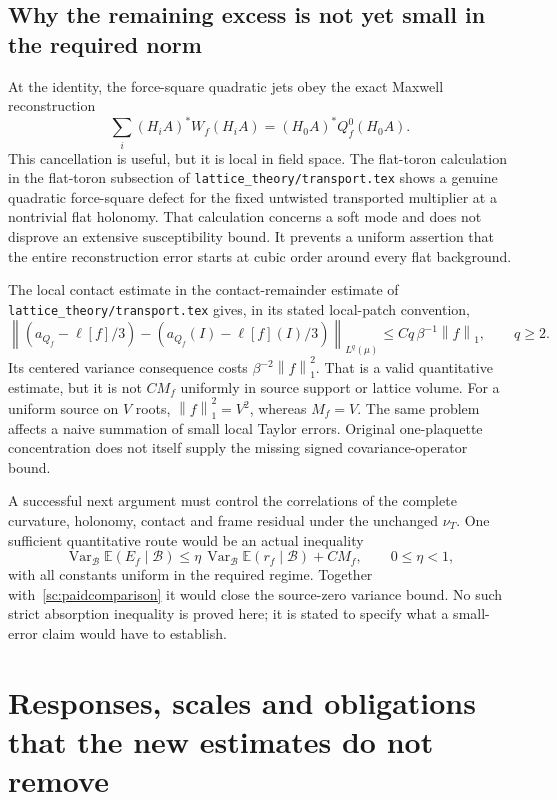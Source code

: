 \documentclass[11pt]{article}
\theoremstyle{definition}\newtheorem{definition}[theorem]{Definition}
\theoremstyle{remark}\newtheorem{remark}[theorem]{Remark}
\newcommand{\E}{\mathbb E}\newcommand{\Var}{\operatorname{Var}}
\newcommand{\norm}[1]{\left\lVert #1\right\rVert}
\begin{document}
\subsection{Why the remaining excess is not yet small in the required norm}

At the identity, the force-square quadratic jets obey the exact Maxwell reconstruction
\[
 \sum_i(H_iA)^*W_f(H_iA)
       =(H_0A)^*Q_f^0(H_0A).
\]
This cancellation is useful, but it is local in field space. The flat-toron calculation in the flat-toron subsection of \texttt{lattice\_theory/transport.tex} shows a genuine quadratic force-square defect for the fixed untwisted transported multiplier at a nontrivial flat holonomy. That calculation concerns a soft mode and does not disprove an extensive susceptibility bound. It prevents a uniform assertion that the entire reconstruction error starts at cubic order around every flat background.

The local contact estimate in the contact-remainder estimate of \texttt{lattice\_theory/transport.tex} gives, in its stated local-patch convention,
\[
 \norm{(a_{Q_f}-\ell[f]/3)
       -(a_{Q_f}(I)-\ell[f](I)/3)}_{L^q(\mu)}
       \le Cq\,\beta^{-1}\norm f_1,\qquad q\ge2 .
\]
Its centered variance consequence costs \(\beta^{-2}\norm f_1^2\). That is a valid quantitative estimate, but it is not \(CM_f\) uniformly in source support or lattice volume. For a uniform source on \(V\) roots, \(\norm f_1^2=V^2\), whereas \(M_f=V\). The same problem affects a naive summation of small local Taylor errors. Original one-plaquette concentration does not itself supply the missing signed covariance-operator bound.

A successful next argument must control the correlations of the complete curvature, holonomy, contact and frame residual under the unchanged \(\nu_T\). One sufficient quantitative route would be an actual inequality
\[
 \Var_{\mathcal B}\E(E_f\mid\mathcal B)
 \le \eta\,\Var_{\mathcal B}\E(r_f\mid\mathcal B)+CM_f,
 \qquad 0\le\eta<1,
\]
with all constants uniform in the required regime. Together with~\eqref{sc:paidcomparison} it would close the source-zero variance bound. No such strict absorption inequality is proved here; it is stated to specify what a small-error claim would have to establish.

\section{Responses, scales and obligations that the new estimates do not remove}
\label{sc:obligations}
\end{document}
